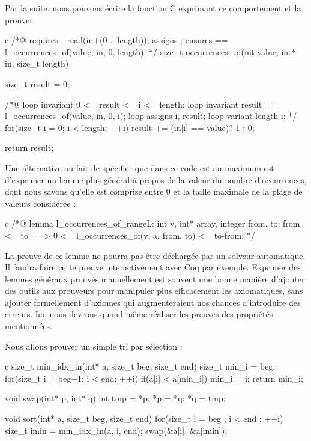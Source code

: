 Par la suite, nous pouvons écrire la fonction C exprimant ce comportement et la
prouver :



\begin{CodeBlock}{c}
/*@
  requires \valid_read(in+(0 .. length));
  assigns  \nothing;
  ensures  \result == l_occurrences_of(value, in, 0, length);
*/
size_t occurrences_of(int value, int* in, size_t length){
  size_t result = 0;
  
  /*@
    loop invariant 0 <= result <= i <= length;
    loop invariant result == l_occurrences_of(value, in, 0, i);
    loop assigns i, result;
    loop variant length-i;
  */
  for(size_t i = 0; i < length; ++i)
    result += (in[i] == value)? 1 : 0;

  return result;
}
\end{CodeBlock}



Une alternative au fait de spécifier que dans ce code  est au 
maximum  est d'exprimer un lemme plus général à propos de la valeur
du nombre d'occurrences, dont nous savons qu'elle est comprise entre 0 et 
la taille maximale de la plage de valeurs considérée :



\begin{CodeBlock}{c}
/*@
lemma l_occurrences_of_range{L}:
  \forall int v, int* array, integer from, to:
    from <= to ==> 0 <= l_occurrences_of(v, a, from, to) <= to-from;
*/
\end{CodeBlock}



La preuve de ce lemme ne pourra pas être déchargée par un solveur automatique. Il
faudra faire cette preuve interactivement avec Coq par exemple. Exprimer des 
lemmes généraux prouvés manuellement est souvent une bonne manière d'ajouter des
outils aux prouveurs pour manipuler plus efficacement les axiomatiques, sans 
ajouter formellement d'axiomes qui augmenteraient nos chances d'introduire des
erreurs. Ici, nous devrons quand même réaliser les preuves des propriétés 
mentionnées.





Nous allons prouver un simple tri par sélection :



\begin{CodeBlock}{c}
size_t min_idx_in(int* a, size_t beg, size_t end){
  size_t min_i = beg;
  for(size_t i = beg+1; i < end; ++i)
    if(a[i] < a[min_i]) min_i = i;
  return min_i;
}

void swap(int* p, int* q){
  int tmp = *p; *p = *q; *q = tmp;
}

void sort(int* a, size_t beg, size_t end){
  for(size_t i = beg ; i < end ; ++i){
    size_t imin = min_idx_in(a, i, end);
    swap(&a[i], &a[imin]);
  }
}
\end{CodeBlock}




